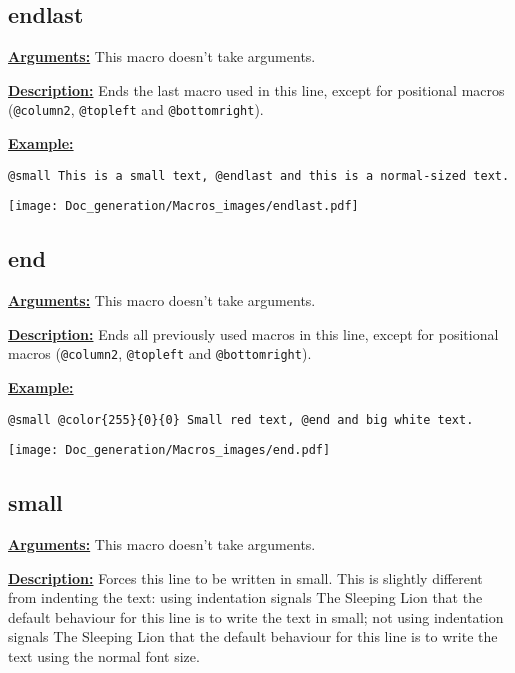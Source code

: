 \documentclass{article}
\begin{document}
\subsection{endlast}
\textbf{\underline{Arguments:}} This macro doesn't take arguments.

\textbf{\underline{Description:}} Ends the last macro used in this line, except for positional macros (\verb`@column2`, \verb`@topleft` and \verb`@bottomright`).

\textbf{\underline{Example:}}

\begin{BVerbatim}
@small This is a small text, @endlast and this is a normal-sized text.
\end{BVerbatim}

\begin{center}
\texttt{[image: Doc\_generation/Macros\_images/endlast.pdf]}
\end{center}

\subsection{end}
\textbf{\underline{Arguments:}} This macro doesn't take arguments.

\textbf{\underline{Description:}} Ends all previously used macros in this line, except for positional macros (\verb`@column2`, \verb`@topleft` and \verb`@bottomright`). 

\textbf{\underline{Example:}}

\begin{center}
\begin{BVerbatim}
@small @color{255}{0}{0} Small red text, @end and big white text.
\end{BVerbatim}

\texttt{[image: Doc\_generation/Macros\_images/end.pdf]}
\end{center}


\subsection{small}
\textbf{\underline{Arguments:}} This macro doesn't take arguments.

\textbf{\underline{Description:}} Forces this line to be written in small. This is slightly different from indenting the text: using indentation signals The Sleeping Lion that the default behaviour for this line is to write the text in small; not using indentation signals The Sleeping Lion that the default behaviour for this line is to write the text using the normal font size. 
\end{document}

